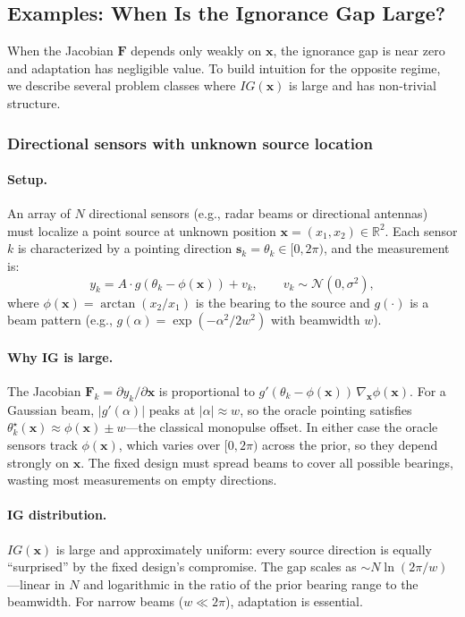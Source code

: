 \documentclass[11pt,a4paper]{article}
\newcommand{\R}{\mathbb{R}}
\begin{document}
\subsection{Examples: When Is the Ignorance Gap Large?}

When the Jacobian $\bm{F}$ depends only weakly on $\bm{x}$, the ignorance gap is near zero and adaptation has negligible value.  To build intuition for the opposite regime, we describe several problem classes where $IG(\bm{x})$ is large and has non-trivial structure.

\subsubsection{Directional sensors with unknown source location}

\paragraph{Setup.}
An array of $N$ directional sensors (e.g., radar beams or directional antennas) must localize a point source at unknown position $\bm{x} = (x_1, x_2) \in \R^2$.  Each sensor $k$ is characterized by a pointing direction $\bm{s}_k = \theta_k \in [0, 2\pi)$, and the measurement is:
\begin{equation}
  y_k = A \cdot g(\theta_k - \phi(\bm{x})) + v_k, \qquad v_k \sim \mathcal{N}(0, \sigma^2),
\end{equation}
where $\phi(\bm{x}) = \arctan(x_2/x_1)$ is the bearing to the source and $g(\cdot)$ is a beam pattern (e.g., $g(\alpha) = \exp(-\alpha^2 / 2w^2)$ with beamwidth $w$).

\paragraph{Why IG is large.}
The Jacobian $\bm{F}_k = \partial y_k / \partial \bm{x}$ is proportional to $g'(\theta_k - \phi(\bm{x}))\,\nabla_{\bm{x}}\phi(\bm{x})$.  For a Gaussian beam, $|g'(\alpha)|$ peaks at $|\alpha|\approx w$, so the oracle pointing satisfies $\theta_k^\star(\bm{x}) \approx \phi(\bm{x}) \pm w$---the classical monopulse offset.  In either case the oracle sensors track $\phi(\bm{x})$, which varies over $[0, 2\pi)$ across the prior, so they depend strongly on $\bm{x}$.  The fixed design must spread beams to cover all possible bearings, wasting most measurements on empty directions.

\paragraph{IG distribution.}
$IG(\bm{x})$ is large and approximately uniform: every source direction is equally ``surprised'' by the fixed design's compromise.  The gap scales as $\sim N \ln(2\pi / w)$---linear in $N$ and logarithmic in the ratio of the prior bearing range to the beamwidth.  For narrow beams ($w \ll 2\pi$), adaptation is essential.
\end{document}
